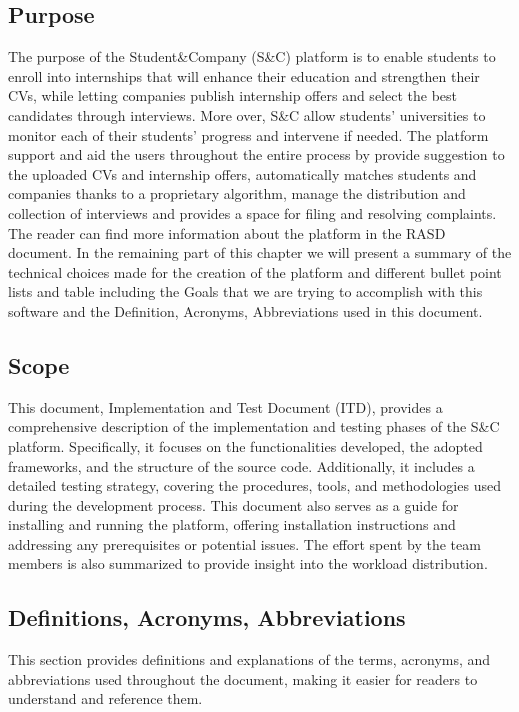 \subsection{Purpose}
The purpose of the Student\&Company (S\&C) platform is to enable students to enroll into internships that will enhance their education and strengthen their CVs, while letting companies publish internship offers and select the best candidates through interviews. More over, S\&C allow students' universities to monitor each of their students' progress and intervene if needed.
The platform support and aid the users throughout the entire process by provide suggestion to the uploaded CVs and internship offers, automatically matches students and companies thanks to a proprietary algorithm, manage the distribution and collection of interviews and provides a space for filing and resolving complaints. The reader can find more information about the platform in the RASD document. 
In the remaining part of this chapter we will present a summary of the technical choices made for the creation of the platform and different bullet point lists and table including the Goals that we are trying to accomplish with this software and the Definition, Acronyms, Abbreviations used in this document.
\subsection{Scope}
This document, Implementation and Test Document (ITD), provides a comprehensive description of the implementation and testing phases of the S\&C platform. Specifically, it focuses on the functionalities developed, the adopted frameworks, and the structure of the source code. Additionally, it includes a detailed testing strategy, covering the procedures, tools, and methodologies used during the development process. This document also serves as a guide for installing and running the platform, offering installation instructions and addressing any prerequisites or potential issues. The effort spent by the team members is also summarized to provide insight into the workload distribution.

\subsection{Definitions, Acronyms, Abbreviations} 
This section provides definitions and explanations of the terms, acronyms, and abbreviations used throughout the document, making it easier for readers to understand and reference them.
